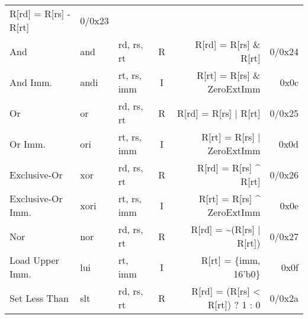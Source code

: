 \begin{tabularx}{\textwidth}{lMAcDr}
    R[rd] = R[rs] - R[rt]                                                           & 0/0x23                       \\
    And                                                                             & and    & rd, rs, rt    & R &
    R[rd] = R[rs] \& R[rt]                                                          & 0/0x24                       \\
    And Imm.                                                                        & andi   & rt, rs, imm   & I &
    R[rt] = R[rs] \& ZeroExtImm                    \footnotemark[3]                 & 0x0c                         \\
    Or                                                                              & or     & rd, rs, rt    & R &
    R[rd] = R[rs] | R[rt]                                                           & 0/0x25                       \\
    Or Imm.                                                                         & ori    & rt, rs, imm   & I &
    R[rt] = R[rs] | ZeroExtImm                     \footnotemark[3]                 & 0x0d                         \\
    Exclusive-Or                                                                    & xor    & rd, rs, rt    & R &
    R[rd] = R[rs] \textasciicircum{} R[rt]                                          & 0/0x26                       \\
    Exclusive-Or Imm.                                                               & xori   & rt, rs, imm   & I &
    R[rt] = R[rs] \textasciicircum{} ZeroExtImm    \footnotemark[3]                 & 0x0e                         \\
    Nor                                                                             & nor    & rd, rs, rt    & R &
    R[rd] = \textasciitilde (R[rs] | R[rt])                                         & 0/0x27                       \\
    Load Upper Imm.                                                                 & lui    & rt, imm       & I &
    R[rt] = \{imm, 16'b0\}                                                          & 0x0f                         \\
    \midrule
    Set Less Than                                                                   & slt    & rd, rs, rt    & R &
    R[rd] = (R[rs] < R[rt]) ? 1 : 0                                                 & 0/0x2a                       \\

\end{tabularx}
